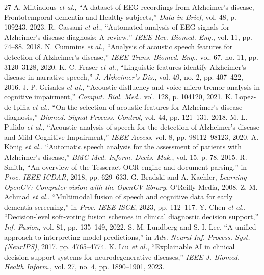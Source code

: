 \documentclass[conference]{IEEEtran}
\begin{document}
\begin{thebibliography}{27}
 A. Miltiadous \textit{et al.}, ``A dataset of EEG recordings from Alzheimer's disease, Frontotemporal dementia and Healthy subjects,'' \textit{Data in Brief}, vol. 48, p. 109243, 2023.
 R. Cassani \textit{et al.}, ``Automated analysis of EEG signals for Alzheimer's disease diagnosis: A review,'' \textit{IEEE Rev. Biomed. Eng.}, vol. 11, pp. 74--88, 2018.
 N. Cummins \textit{et al.}, ``Analysis of acoustic speech features for detection of Alzheimer's disease,'' \textit{IEEE Trans. Biomed. Eng.}, vol. 67, no. 11, pp. 3120--3128, 2020.
 K. C. Fraser \textit{et al.}, ``Linguistic features identify Alzheimer's disease in narrative speech,'' \textit{J. Alzheimer's Dis.}, vol. 49, no. 2, pp. 407--422, 2016.
 J. P. Grisales \textit{et al.}, ``Acoustic disfluency and voice micro-tremor analysis in cognitive impairment,'' \textit{Comput. Biol. Med.}, vol. 128, p. 104120, 2021.
 K. Lopez-de-Ipiña \textit{et al.}, ``On the selection of acoustic features for Alzheimer's disease diagnosis,'' \textit{Biomed. Signal Process. Control}, vol. 44, pp. 121--131, 2018.
 M. L. Pulido \textit{et al.}, ``Acoustic analysis of speech for the detection of Alzheimer's disease and Mild Cognitive Impairment,'' \textit{IEEE Access}, vol. 8, pp. 98112--98123, 2020.
 A. König \textit{et al.}, ``Automatic speech analysis for the assessment of patients with Alzheimer's disease,'' \textit{BMC Med. Inform. Decis. Mak.}, vol. 15, p. 78, 2015.
 R. Smith, ``An overview of the Tesseract OCR engine and document parsing,'' in \textit{Proc. IEEE ICDAR}, 2018, pp. 629--633.
 G. Bradski and A. Kaehler, \textit{Learning OpenCV: Computer vision with the OpenCV library}, O'Reilly Media, 2008.
 Z. M. Achmad \textit{et al.}, ``Multimodal fusion of speech and cognitive data for early dementia screening,'' in \textit{Proc. IEEE ISCE}, 2023, pp. 112--117.
 Y. Chen \textit{et al.}, ``Decision-level soft-voting fusion schemes in clinical diagnostic decision support,'' \textit{Inf. Fusion}, vol. 81, pp. 135--149, 2022.
 S. M. Lundberg and S. I. Lee, ``A unified approach to interpreting model predictions,'' in \textit{Adv. Neural Inf. Process. Syst. (NeurIPS)}, 2017, pp. 4765--4774.
 K. Liu \textit{et al.}, ``Explainable AI in clinical decision support systems for neurodegenerative diseases,'' \textit{IEEE J. Biomed. Health Inform.}, vol. 27, no. 4, pp. 1890--1901, 2023.
\end{thebibliography}
\end{document}
